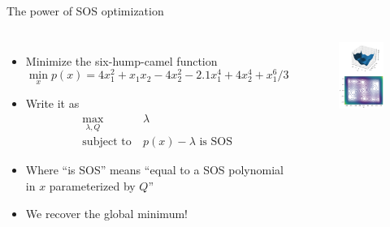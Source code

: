 \documentclass[aspectratio=169]{beamer}
\begin{document}
\begin{frame}{The power of SOS optimization \href{https://colab.research.google.com/github/RussTedrake/underactuated/blob/master/examples/optimization.ipynb}{}}
\begin{columns}
\begin{itemize}
\item
Minimize the six-hump-camel function
$$
\min_x p(x) = 4 x_1^2 + x_1 x_2 - 4 x_2^2 - 2.1 x_1^4 + 4 x_2^4 + x_1^6 / 3
$$
\item
Write it as
\begin{align*}
\max_{ \lambda, Q} \ & \lambda \\
\text{subject to} \ &  p(x) - \lambda \text{ is SOS}
\end{align*}
\item
Where ``is SOS'' means ``equal to a SOS polynomial in $x$ parameterized by $Q$''
\item
We recover the global minimum!
\end{itemize}
\vspace{-5mm}
\begin{figure}
\includegraphics[width=\columnwidth]{figures/camel.pdf}
\end{figure}
\end{columns}
\end{frame}
\end{document}
